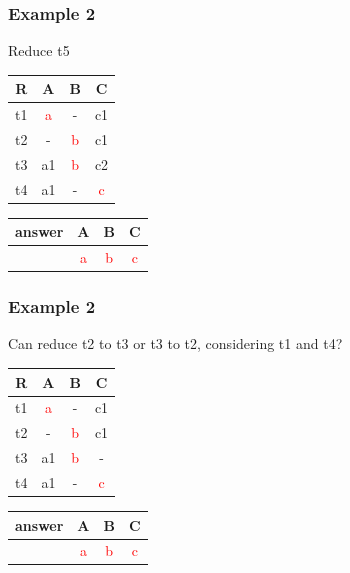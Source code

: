 \documentclass{beamer}
\begin{document}
\begin{frame}
  \frametitle{Example 2}
  Reduce t5
  
  \begin{tabular}{ c | c c c}
  R & A & B & C \\
  \hline
  t1 & \textcolor{red}{a}  & -  & c1 \\
  t2 & -  & \textcolor{red}{b}  & c1 \\
  t3 & a1 & \textcolor{red}{b} & c2 \\
  t4 & a1 & - & \textcolor{red}{c} \\
  \end{tabular}
  \begin{tabular}{ c | c c c}
  answer & A & B & C \\
  \hline
   & \textcolor{red}{a}& \textcolor{red}{b}& \textcolor{red}{c}\\
  \end{tabular}
\end{frame}

\begin{frame}
  \frametitle{Example 2}
  
  Can reduce t2 to t3 or t3 to t2, considering t1 and t4?
  
  \begin{tabular}{ c | c c c}
  R & A & B & C \\
  \hline
  t1 & \textcolor{red}{a}  & -  & c1 \\
  t2 & -  & \textcolor{red}{b}  & c1 \\
  t3 & a1 & \textcolor{red}{b} & - \\
  t4 & a1 & - & \textcolor{red}{c} \\
  \end{tabular}
  \begin{tabular}{ c | c c c}
  answer & A & B & C \\
  \hline
   & \textcolor{red}{a}& \textcolor{red}{b}& \textcolor{red}{c}\\
  \end{tabular}
\end{frame}
\end{document}
